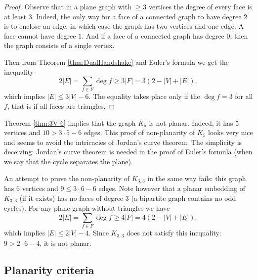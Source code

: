 \begin{page}
\setcounter{section}{3}
\setcounter{subsection}{3}
\setcounter{dfn}{9}
\label{portion:303}

\begin{proof}
Observe that in a plane graph with $\ge 3$ vertices the degree of every face is at least $3$.
Indeed, the only way for a face of a connected graph to have degree $2$ is to enclose an edge, in which case the graph has two vertices and one edge.
A face cannot have degree $1$. And if a face of a connected graph has degree $0$, then the graph consists of a single vertex.

Then from Theorem \ref{thm:DualHandshake} and Euler's formula we get the inequality
\[
2 |E| = \sum_{f \in F} \deg f \ge 3 |F| = 3 (2 - |V| + |E|),
\]
which implies $|E| \le 3|V| - 6$.
The equality takes place only if the $\deg f = 3$ for all $f$, that is if all faces are triangles.
\end{proof}

Theorem \ref{thm:3V-6} implies that the graph $K_5$ is not planar.
Indeed, it has $5$ vertices and $10 > 3\cdot 5 - 6$ edges.
This proof of non-planarity of $K_5$ looks very nice and seems to avoid the intricacies of Jordan's curve theorem.
The simplicity is deceiving: Jordan's curve theorem is needed in the proof of Euler's formula (when we say that the cycle separates the plane).

An attempt to prove the non-planarity of $K_{3,3}$ in the same way fails:
this graph has $6$ vertices and $9 \le 3 \cdot 6 - 6$ edges.
Note however that a planar embedding of $K_{3,3}$ (if it exists) has no faces of degree $3$ (a bipartite graph contains no odd cycles).
For any plane graph without triangles we have
\[
2 |E| = \sum_{f \in F} \deg f \ge 4 |F| = 4 (2 - |V| + |E|),
\]
which implies $|E| \le 2|V| - 4$.
Since $K_{3,3}$ does not satisfy this inequality: $9 > 2 \cdot 6 - 4$, it is not planar.





\end{page}

\begin{page}
\setcounter{section}{3}
\setcounter{subsection}{3}
\setcounter{dfn}{9}
\label{portion:304}

\subsection{Planarity criteria}

\end{page}

